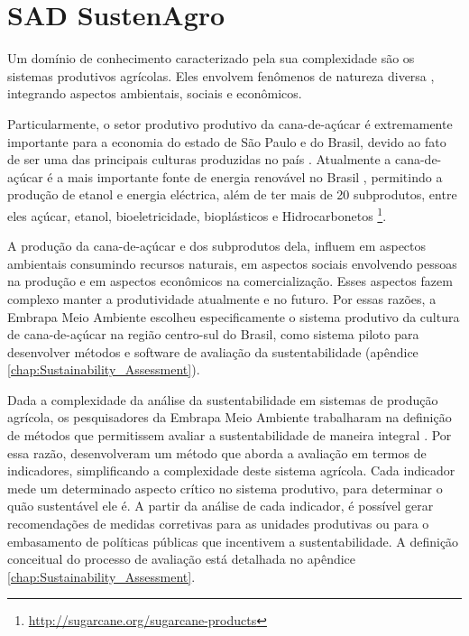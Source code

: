 \section{SAD SustenAgro\label{sec:SAD-SustenAgro}}

Um domínio de conhecimento caracterizado pela sua complexidade são
os sistemas produtivos agrícolas. Eles envolvem fenômenos de natureza
diversa \citep{simon1991architecture}, integrando aspectos ambientais,
sociais e econômicos.

Particularmente, o setor produtivo produtivo da cana-de-açúcar é extremamente
importante para a economia do estado de São Paulo e do Brasil, devido
ao fato de ser uma das principais culturas produzidas no país \citep{Storquato2015}.
Atualmente a cana-de-açúcar é a mais importante fonte de energia renovável
no Brasil \citep{seabra2011life}, permitindo a produção de etanol
e energia eléctrica, além de ter mais de 20 subprodutos, entre eles
açúcar, etanol, bioeletricidade, bioplásticos e Hidrocarbonetos \footnote{\url{http://sugarcane.org/sugarcane-products}}. 

A produção da cana-de-açúcar e dos subprodutos dela, influem em aspectos
ambientais consumindo recursos naturais, em aspectos sociais envolvendo
pessoas na produção e em aspectos econômicos na comercialização. Esses
aspectos fazem complexo manter a produtividade atualmente e no futuro.
Por essas razões, a Embrapa Meio Ambiente escolheu especificamente
o sistema produtivo da cultura de cana-de-açúcar na região centro-sul
do Brasil, como sistema piloto para desenvolver métodos e software
de avaliação da sustentabilidade (apêndice \ref{chap:Sustainability_Assessment}).

Dada a complexidade da análise da sustentabilidade em sistemas de
produção agrícola, os pesquisadores da Embrapa Meio Ambiente trabalharam
na definição de métodos que permitissem avaliar a sustentabilidade
de maneira integral \citep{Singh2012281}. Por essa razão, desenvolveram
um método que aborda a avaliação em termos de indicadores, simplificando
a complexidade deste sistema agrícola. Cada indicador mede um determinado
aspecto crítico no sistema produtivo, para determinar o quão sustentável
ele é. A partir da análise de cada indicador, é possível gerar recomendações
de medidas corretivas para as unidades produtivas ou para o embasamento
de políticas públicas que incentivem a sustentabilidade. A definição
conceitual do processo de avaliação está detalhada no apêndice \ref{chap:Sustainability_Assessment}. 


